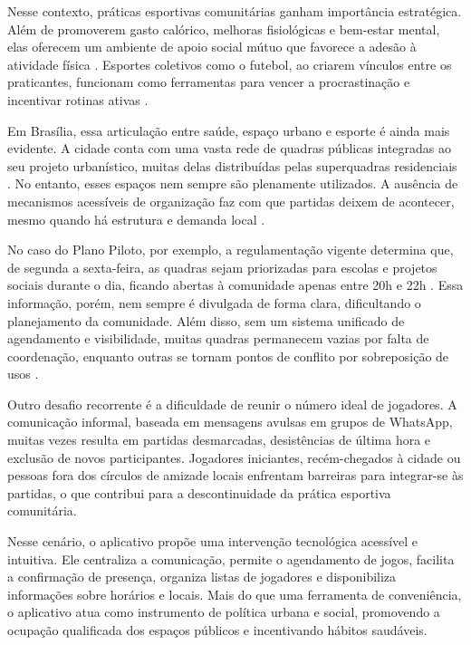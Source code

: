Nesse contexto, práticas esportivas comunitárias ganham importância estratégica. Além de promoverem gasto calórico, melhoras fisiológicas e bem-estar mental, elas oferecem um ambiente de apoio social mútuo que favorece a adesão à atividade física \cite{ministerio2023}. Esportes coletivos como o futebol, ao criarem vínculos entre os praticantes, funcionam como ferramentas para vencer a procrastinação e incentivar rotinas ativas \cite{ministerio2023,carbinatto2022}.

Em Brasília, essa articulação entre saúde, espaço urbano e esporte é ainda mais evidente. A cidade conta com uma vasta rede de quadras públicas integradas ao seu projeto urbanístico, muitas delas distribuídas pelas superquadras residenciais \cite{segov2023}. No entanto, esses espaços nem sempre são plenamente utilizados. A ausência de mecanismos acessíveis de organização faz com que partidas deixem de acontecer, mesmo quando há estrutura e demanda local \cite{ipea2021}.

No caso do Plano Piloto, por exemplo, a regulamentação vigente determina que, de segunda a sexta-feira, as quadras sejam priorizadas para escolas e projetos sociais durante o dia, ficando abertas à comunidade apenas entre 20h e 22h \cite{peixoto2025}. Essa informação, porém, nem sempre é divulgada de forma clara, dificultando o planejamento da comunidade. Além disso, sem um sistema unificado de agendamento e visibilidade, muitas quadras permanecem vazias por falta de coordenação, enquanto outras se tornam pontos de conflito por sobreposição de usos \cite{agenciabrasilia2025}.

Outro desafio recorrente é a dificuldade de reunir o número ideal de jogadores. A comunicação informal, baseada em mensagens avulsas em grupos de WhatsApp, muitas vezes resulta em partidas desmarcadas, desistências de última hora e exclusão de novos participantes. Jogadores iniciantes, recém-chegados à cidade ou pessoas fora dos círculos de amizade locais enfrentam barreiras para integrar-se às partidas, o que contribui para a descontinuidade da prática esportiva comunitária.

Nesse cenário, o aplicativo propõe uma intervenção tecnológica acessível e intuitiva. Ele centraliza a comunicação, permite o agendamento de jogos, facilita a confirmação de presença, organiza listas de jogadores e disponibiliza informações sobre horários e locais. Mais do que uma ferramenta de conveniência, o aplicativo atua como instrumento de política urbana e social, promovendo a ocupação qualificada dos espaços públicos e incentivando hábitos saudáveis.

